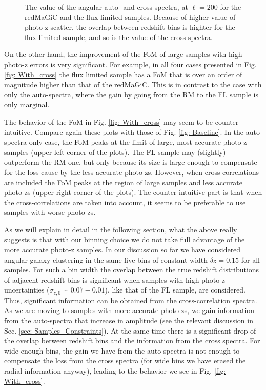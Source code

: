 \documentclass[a4paper,fleqn,usenatbib]{mnras}
\begin{document}
\begin{figure}
\centering
{}

\caption{The value of the angular auto- and cross-spectra, at $\ell =200$ for the redMaGiC and the flux limited samples. Because of higher value of photo-z scatter, the overlap between redshift bins is highter for the flux limited sample, and so is the value of the cross-spectra.}
\label{fig: Importance}
\end{figure}

On the other hand, the improvement of the FoM of large samples with high photo-z errors is very significant. For example, in all four cases presented in Fig. \ref{fig: With_cross}  the flux limited sample has a FoM that is over an order of magnitude higher than that of the redMaGiC. This is in contrast to the case with only the auto-spectra, where the gain by going from the RM to the FL sample is only marginal.

The behavior of the FoM in Fig. \ref{fig: With_cross} may seem to be counter-intuitive. Compare again these plots with those of Fig. \ref{fig: Baseline}. In the auto-spectra only case, the FoM peaks at the limit of large, most accurate photo-z samples (upper left corner of the plots). The FL sample may (slightly) outperform the RM one, but only because its size is large enough to compensate for the loss cause by the less accurate photo-zs. However, when cross-correlations are included the FoM peaks at the region of large samples and less accurate photo-zs (upper right corner of the plots). The counter-intuitive part is that when the cross-correlations are taken into account, it seems to be preferable to use  samples with worse photo-zs.

As we will explain in detail in the following section, what the above really suggests is that with our binning choice we do not take full advantage of the more accurate photo-z samples. In our discussion so far we have considered angular galaxy clustering in the same five bins of constant width $\delta z = 0.15$ for all samples. For such a bin width the overlap between the true redshift distributions of adjacent  redshift bins is significant when samples with high photo-z uncertainties ($\sigma_{z,0} \sim 0.07-0.01$), like that of the FL sample, are considered. Thus, significant information can be  obtained from the cross-correlation spectra. As we are moving to samples with more accurate photo-zs, we gain information from the auto-spectra that increase in amplitude (see the relevant discussion in Sec. \ref{sec: Samples_Constraints}). At the same time there is a significant drop of the overlap between redshift bins and the information from the cross spectra. For wide enough bins, the gain we have from the auto spectra is not enough to compensate the loss from the cross spectra (for wide bins we have erased the radial information anyway), leading to the behavior we see in Fig. \ref{fig: With_cross}.
\end{document}

